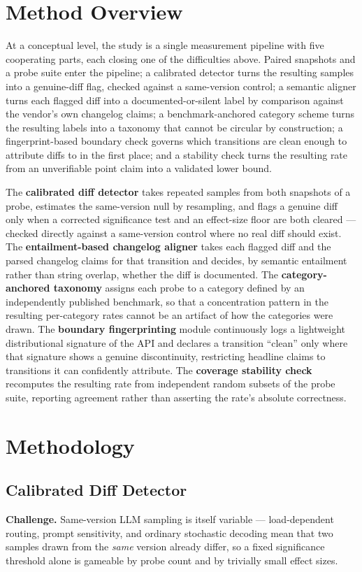 \documentclass[11pt]{article}
\begin{document}
\section{Method Overview}

At a conceptual level, the study is a single measurement pipeline with five cooperating parts, each closing one of the difficulties above. Paired snapshots and a probe suite enter the pipeline; a calibrated detector turns the resulting samples into a genuine-diff flag, checked against a same-version control; a semantic aligner turns each flagged diff into a documented-or-silent label by comparison against the vendor's own changelog claims; a benchmark-anchored category scheme turns the resulting labels into a taxonomy that cannot be circular by construction; a fingerprint-based boundary check governs which transitions are clean enough to attribute diffs to in the first place; and a stability check turns the resulting rate from an unverifiable point claim into a validated lower bound.

The \textbf{calibrated diff detector} takes repeated samples from both snapshots of a probe, estimates the same-version null by resampling, and flags a genuine diff only when a corrected significance test and an effect-size floor are both cleared --- checked directly against a same-version control where no real diff should exist. The \textbf{entailment-based changelog aligner} takes each flagged diff and the parsed changelog claims for that transition and decides, by semantic entailment rather than string overlap, whether the diff is documented. The \textbf{category-anchored taxonomy} assigns each probe to a category defined by an independently published benchmark, so that a concentration pattern in the resulting per-category rates cannot be an artifact of how the categories were drawn. The \textbf{boundary fingerprinting} module continuously logs a lightweight distributional signature of the API and declares a transition ``clean'' only where that signature shows a genuine discontinuity, restricting headline claims to transitions it can confidently attribute. The \textbf{coverage stability check} recomputes the resulting rate from independent random subsets of the probe suite, reporting agreement rather than asserting the rate's absolute correctness.

\section{Methodology}

\subsection{Calibrated Diff Detector}
\textbf{Challenge.} Same-version LLM sampling is itself variable --- load-dependent routing, prompt sensitivity, and ordinary stochastic decoding mean that two samples drawn from the \emph{same} version already differ, so a fixed significance threshold alone is gameable by probe count and by trivially small effect sizes.
\end{document}
